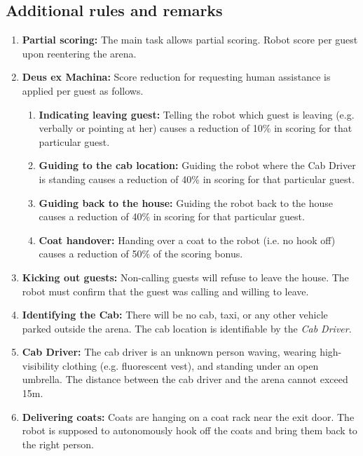 \subsection{Additional rules and remarks}
\begin{enumerate}[nosep]
	\item \textbf{Partial scoring:} The main task allows partial scoring.
	Robot score per guest upon reentering the arena.

	\item \textbf{Deus ex Machina:} Score reduction for requesting human assistance is applied per guest as follows.
	\begin{enumerate}[nosep]
		\item \textbf{Indicating leaving guest:} Telling the robot which guest is leaving (e.g. verbally or pointing at her) causes a reduction of 10\% in scoring for that particular guest.

		\item \textbf{Guiding to the cab location:} Guiding the robot where the Cab Driver is standing causes a reduction of 40\% in scoring for that particular guest.

		\item \textbf{Guiding back to the house:} Guiding the robot back to the house causes a reduction of 40\% in scoring for that particular guest.

		\item \textbf{Coat handover:} Handing over a coat to the robot (i.e. no hook off) causes a reduction of 50\% of the scoring bonus.
	\end{enumerate}

	\item \textbf{Kicking out guests:} Non-calling guests will refuse to leave the house. The robot must confirm that the guest was calling and willing to leave.
	
	\item \textbf{Identifying the Cab:} There will be no cab, taxi, or any other vehicle parked outside the arena.
	The cab location is identifiable by the \emph{Cab Driver}.

	\item \textbf{Cab Driver:} The cab driver is an unknown person waving, wearing high-visibility clothing (e.g. fluorescent vest), and standing under an open umbrella.
	The distance between the cab driver and the arena cannot exceed 15m.
	
	\item \textbf{Delivering coats:} Coats are hanging on a coat rack near the exit door.
	The robot is supposed to autonomously hook off the coats and bring them back to the right person.
\end{enumerate}


